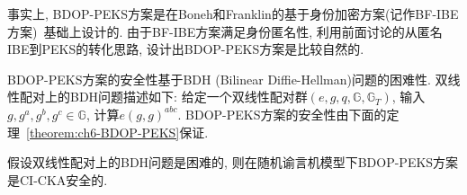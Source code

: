 \begin{note}
事实上, BDOP-PEKS方案是在Boneh和Franklin的基于身份加密方案(记作BF-IBE方案)~\cite{BF-SIAM-2003}基础上设计的. 由于BF-IBE方案满足身份匿名性, 利用前面讨论的从匿名IBE到PEKS的转化思路, 设计出BDOP-PEKS方案是比较自然的.
\end{note}


BDOP-PEKS方案的安全性基于BDH (Bilinear Diffie-Hellman)问题的困难性. 双线性配对上的BDH问题描述如下: 给定一个双线性配对群$(e, g, q, \mathbb{G}, \mathbb{G}_T)$, 输入$g, g^a, g^b, g^c \in \mathbb{G}$, 计算$e(g, g)^{abc}$. BDOP-PEKS方案的安全性由下面的定理~\ref{theorem:ch6-BDOP-PEKS}保证.

\begin{theorem}\label{theorem:ch6-BDOP-PEKS}
假设双线性配对上的BDH问题是困难的, 则在随机谕言机模型下BDOP-PEKS方案是CI-CKA安全的.
\end{theorem}

